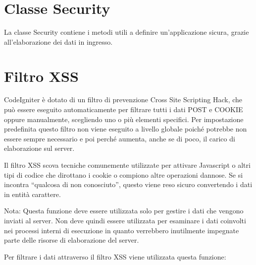 \section{Classe Security}
\label{class:sicurezza}

La classe Security contiene i metodi utili a definire un'applicazione sicura, grazie all'elaborazione dei dati in ingresso.

\section*{Filtro XSS}
CodeIgniter è dotato di un filtro di prevenzione Cross Site Scripting Hack, che può essere eseguito automaticamente per filtrare tutti i dati POST e COOKIE oppure manualmente, scegliendo uno o più elementi specifici. Per impostazione predefinita questo filtro non viene eseguito a livello globale poiché potrebbe non essere sempre necessario e poi perché aumenta, anche se di poco, il carico di elaborazione sul server.

Il filtro XSS scova tecniche comunemente utilizzate per attivare Javascript o altri tipi di codice che dirottano i cookie o compiono altre operazioni dannose. Se si incontra ``qualcosa di non conosciuto'', questo viene reso sicuro convertendo i dati in entità carattere.

Nota: Questa funzione deve essere utilizzata solo per gestire i dati che vengono inviati al server. Non deve quindi essere utilizzata per esaminare i dati coinvolti nei processi interni di esecuzione in quanto verrebbero inutilmente impegnate parte delle risorse di elaborazione del server.

Per filtrare i dati attraverso il filtro \ac{XSS} viene utilizzata questa funzione:

